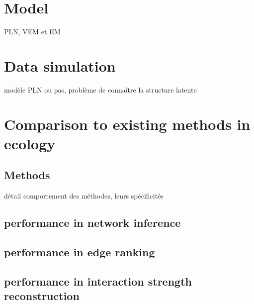 \section{Model}
	PLN, VEM et EM
	\section{Data simulation}
modèle PLN ou pas, problème de connaître la structure latente

	\section{Comparison to existing methods in ecology}
	\subsection{Methods }
	
	détail comportement des méthodes, leurs spécificités
	
	\subsection{performance in network inference}
	\subsection{performance in edge ranking}
	\subsection{performance in interaction strength reconstruction}
	